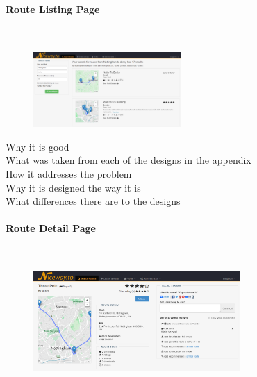 \paragraph{Route Listing Page}\ \\
\begin{figure}[!ht]
	\vspace{-5mm}
	\begin{center}
		\includegraphics[width=0.5\textwidth]{images/design/listing.png}
	\end{center}
	\vspace{-10mm}
\end{figure}

{\color{red}
\noindent 
Why it is good\ \\
What was taken from each of the designs in the appendix\ \\
How it addresses the problem \ \\
Why it is designed the way it is\ \\
What differences there are to the designs
}

\newpage 
\paragraph{Route Detail Page}\ \\
\begin{figure}[!ht]
	\vspace{-5mm}
	\begin{center}
		\includegraphics[width=0.7\textwidth]{images/design/detail.png}
	\end{center}
	\vspace{-5mm}
\end{figure}


